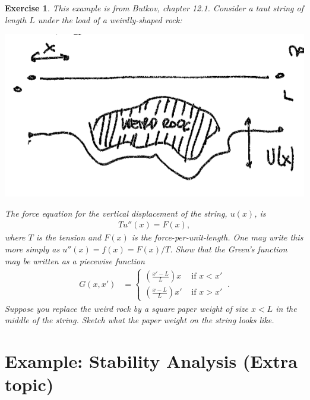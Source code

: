 \documentclass[
  11pt,
	colorful,
	raggedright,
]{tufte-style-thesis-flip}
\newtheorem{exercise}{Exercise}[section]
\begin{document}
\begin{exercise}
This example is from Butkov, chapter 12.1. Consider a taut string of length $L$ under the load of a weirdly-shaped rock:
\begin{center}
\includegraphics[width=.5\textwidth]{figures/lec12_eg.png}
\end{center}
The force equation for the vertical displacement of the string, $u(x)$, is
\begin{align}
  T u''(x) = F(x),
\end{align}
where $T$ is the tension and $F(x)$ is the force-per-unit-length. One may write this more simply as $u''(x) = f(x) = F(x)/T$. Show that the Green's function may be written as a piecewise function
\begin{align}
  G(x,x') &=
  \begin{cases}
  \left(\frac{x'-L}{L}\right)x  & \text{ if } x<x'
  \\
  \left(\frac{x-L}{L}\right)x' & \text{ if } x>x' 
  \end{cases}\ .
\end{align}
Suppose you replace the weird rock by a square paper weight of size $x < L$ in the middle of the string. Sketch what the paper weight on the string looks like.
\end{exercise}


\section{Example: Stability Analysis (Extra topic)}
\end{document}
